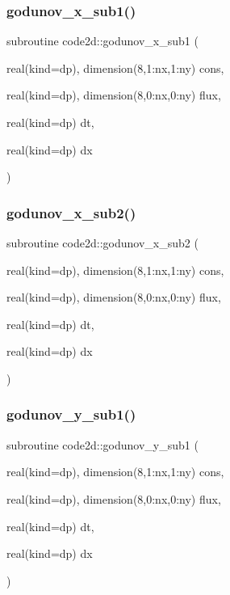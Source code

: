 \subsubsection{\texorpdfstring{godunov\+\_\+x\+\_\+sub1()}{godunov\_x\_sub1()}}
{\footnotesize\ttfamily subroutine code2d\+::godunov\+\_\+x\+\_\+sub1 (\begin{DoxyParamCaption}\item[{real(kind=dp), dimension(8,1\+:nx,1\+:ny)}]{cons,  }\item[{real(kind=dp), dimension(8,0\+:nx,0\+:ny)}]{flux,  }\item[{real(kind=dp)}]{dt,  }\item[{real(kind=dp)}]{dx }\end{DoxyParamCaption})}

\mbox{\label{main2Dv1_8f90_a95998c355563e1e58114aea99de5433b}} 
\subsubsection{\texorpdfstring{godunov\+\_\+x\+\_\+sub2()}{godunov\_x\_sub2()}}
{\footnotesize\ttfamily subroutine code2d\+::godunov\+\_\+x\+\_\+sub2 (\begin{DoxyParamCaption}\item[{real(kind=dp), dimension(8,1\+:nx,1\+:ny)}]{cons,  }\item[{real(kind=dp), dimension(8,0\+:nx,0\+:ny)}]{flux,  }\item[{real(kind=dp)}]{dt,  }\item[{real(kind=dp)}]{dx }\end{DoxyParamCaption})}

\mbox{\label{main2Dv1_8f90_a99b7b2764471880074ec2cb4448c3232}} 
\subsubsection{\texorpdfstring{godunov\+\_\+y\+\_\+sub1()}{godunov\_y\_sub1()}}
{\footnotesize\ttfamily subroutine code2d\+::godunov\+\_\+y\+\_\+sub1 (\begin{DoxyParamCaption}\item[{real(kind=dp), dimension(8,1\+:nx,1\+:ny)}]{cons,  }\item[{real(kind=dp), dimension(8,0\+:nx,0\+:ny)}]{flux,  }\item[{real(kind=dp)}]{dt,  }\item[{real(kind=dp)}]{dx }\end{DoxyParamCaption})}

